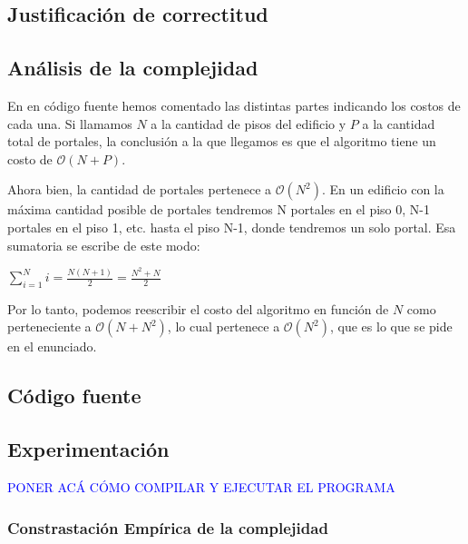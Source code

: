 \subsection{Justificación de correctitud}

\subsection{Análisis de la complejidad}

En en código fuente hemos comentado las distintas partes indicando los costos de cada una. Si llamamos $N$ a la cantidad de pisos del edificio y $P$ a la cantidad total de portales, la conclusión a la que llegamos es que el algoritmo tiene un costo de $\mathcal{O}(N+P)$. 

Ahora bien, la cantidad de portales pertenece a $\mathcal{O}(N^2)$. En un edificio con la máxima cantidad posible de portales tendremos N portales en el piso 0, N-1 portales en el piso 1, etc. hasta el piso N-1, donde tendremos un solo portal. Esa sumatoria se escribe de este modo:

$\displaystyle\sum_{i=1}^{N} i = \frac{N (N+1)}{2} = \frac{N^2 + N}{2}$

Por lo tanto, podemos reescribir el costo del algoritmo en función de $N$ como perteneciente a $\mathcal{O}(N+N^2)$, lo cual pertenece a $\mathcal{O}(N^2)$, que es lo que se pide en el enunciado.
\subsection{Código fuente}

\subsection{Experimentación}

\textcolor{blue}{PONER ACÁ CÓMO COMPILAR Y EJECUTAR EL PROGRAMA}

\subsubsection{Constrastación Empírica de la complejidad}